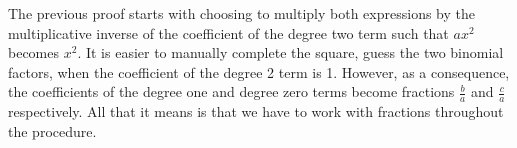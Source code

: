 \documentclass[20150903-160354-rs2.2-MarksMathNotebook.tex]{subfiles}
\begin{document}
The previous proof starts with choosing to multiply both expressions by the multiplicative inverse of the coefficient of the degree two term such that $ax^2$ becomes $x^2$.  It is easier to manually complete the square, guess the two binomial factors, when the coefficient of the degree 2 term is 1.  However, as a consequence, the coefficients of the degree one and degree zero terms become fractions $\frac{b}{a}$ and $\frac{c}{a}$ respectively.  All that it means is that we have to work with fractions throughout the procedure.  \\

   
\end{document}
